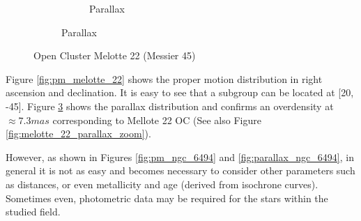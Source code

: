 \documentclass[11pt, a4paper, english]{book}
\begin{document}
\begin{figure}[htbp]
\begin{subfigure}{0.9\textwidth}
\begin{subfigure}[t]{0.45\textwidth}
      \caption{Parallax}
      \label{fig:pm_vec_melotte_22}
    \end{subfigure}
  \end{subfigure}
  \caption{Open Cluster Melotte 22 (Messier 45)}
\end{figure}

Figure \ref{fig:pm_melotte_22} shows the proper motion distribution in right ascension and declination.
It is easy to see that a subgroup can be located at [20, -45].
Figure \ref{fig:pm_vec_melotte_22} shows the parallax distribution and confirms an overdensity at
$\approx 7.3 mas$ corresponding to Mellote 22 OC (See also Figure \ref{fig:melotte_22_parallax_zoom}).

However, as shown in Figures \ref{fig:pm_ngc_6494} and \ref{fig:parallax_ngc_6494},
in general it is not as easy and becomes necessary to consider other parameters such as distances,
or even metallicity and age (derived from isochrone curves).
Sometimes even, photometric data may be required for the stars within the studied field.
\end{document}

